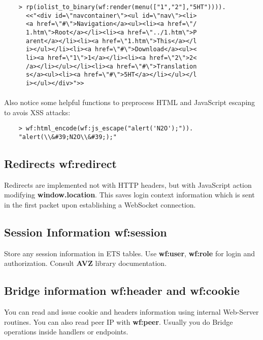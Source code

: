 \vspace{1\baselineskip}
\begin{lstlisting}
    > rp(iolist_to_binary(wf:render(menu(["1","2"],"5HT")))).
      <<"<div id=\"navcontainer\"><ul id=\"nav\"><li>
      <a href=\"#\">Navigation</a><ul><li><a href=\"/
      1.htm\">Root</a></li><li><a href=\"../1.htm\">P
      arent</a></li><li><a href=\"1.htm\">This</a></l
      i></ul></li><li><a href=\"#\">Download</a><ul><
      li><a href=\"1\">1</a></li><li><a href=\"2\">2<
      /a></li></ul></li><li><a href=\"#\">Translation
      s</a><ul><li><a href=\"#\">5HT</a></li></ul></l
      i></ul></div>">>
\end{lstlisting}
\vspace{1\baselineskip}

\paragraph{}
Also notice some helpful functions to preprocess HTML and JavaScript
escaping to avois XSS attacks:

\vspace{1\baselineskip}
\begin{lstlisting}
    > wf:html_encode(wf:js_escape("alert('N2O');")).
    "alert(\\&#39;N2O\\&#39;);"
\end{lstlisting}
\vspace{1\baselineskip}

\subsection{Redirects {\bf wf:redirect}}
Redirects are implemented not with HTTP headers, but with JavaScript action modifying {\bf window.location}.
This saves login context information which is sent in the first packet upon establishing a WebSocket connection.

\subsection{Session Information {\bf wf:session}}
Store any session information in ETS tables. Use {\bf wf:user}, {\bf wf:role} for
login and authorization. Consult {\bf AVZ} library documentation.

\newpage
\subsection{Bridge information {\bf wf:header} and {\bf wf:cookie}}
You can read and issue cookie and headers information using internal Web-Server routines.
You can also read peer IP with {\bf wf:peer}. Usually you do Bridge operations
inside handlers or endpoints.

